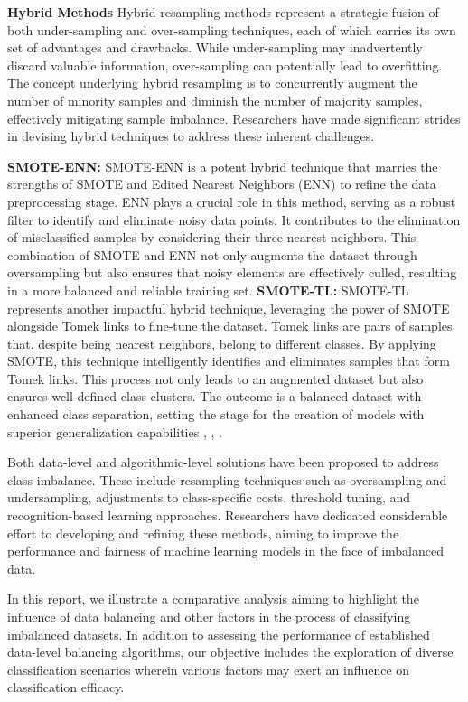 \textbf{Hybrid Methods} 
Hybrid resampling methods represent a strategic fusion of both under-sampling and over-sampling techniques, each of which carries its own set of advantages and drawbacks. While under-sampling may inadvertently discard valuable information, over-sampling can potentially lead to overfitting. The concept underlying hybrid resampling is to concurrently augment the number of minority samples and diminish the number of majority samples, effectively mitigating sample imbalance. Researchers have made significant strides in devising hybrid techniques to address these inherent challenges. 

\textbf{SMOTE-ENN:} SMOTE-ENN is a potent hybrid technique that marries the strengths of SMOTE and Edited Nearest Neighbors (ENN) to refine the data preprocessing stage. ENN plays a crucial role in this method, serving as a robust filter to identify and eliminate noisy data points. It contributes to the elimination of misclassified samples by considering their three nearest neighbors. This combination of SMOTE and ENN not only augments the dataset through oversampling but also ensures that noisy elements are effectively culled, resulting in a more balanced and reliable training set.
\textbf{SMOTE-TL:} SMOTE-TL represents another impactful hybrid technique, leveraging the power of SMOTE alongside Tomek links to fine-tune the dataset. Tomek links are pairs of samples that, despite being nearest neighbors, belong to different classes. By applying SMOTE, this technique intelligently identifies and eliminates samples that form Tomek links. This process not only leads to an augmented dataset but also ensures well-defined class clusters. The outcome is a balanced dataset with enhanced class separation, setting the stage for the creation of models with superior generalization capabilities \cite{Fotouhi2019}, \cite{Xu2020}, \cite{Khushi2021}.

Both data-level and algorithmic-level solutions have been proposed to address class imbalance.
These include resampling techniques such as oversampling and undersampling, adjustments to class-specific costs, threshold tuning, and recognition-based learning approaches. Researchers have dedicated considerable effort to developing and refining these methods, aiming to improve the performance and fairness of machine learning models in the face of imbalanced data.







In this report, we illustrate a comparative analysis aiming to highlight the influence of data balancing and other factors in the process of classifying imbalanced datasets. In addition to assessing the performance of established data-level balancing algorithms, our objective includes the exploration of diverse classification scenarios wherein various factors may exert an influence on classification efficacy.

